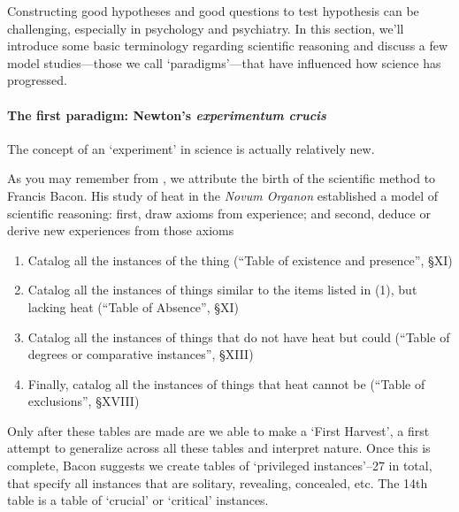\begin{refsection}
Constructing good hypotheses and good questions to test hypothesis can be challenging, especially in psychology and psychiatry. In this section, we’ll introduce some basic terminology regarding scientific reasoning and discuss a few model studies---those we call ‘paradigms’---that have influenced how science has progressed.

\paragraph{The first paradigm: Newton’s \emph{experimentum crucis}}
\label{thefirstparadigm:newton’sexperimentumcrucis}

The concept of an ‘experiment’ in science is actually relatively new. 

As you may remember from , we attribute the birth of the scientific method to Francis Bacon. His study of heat in the \emph{Novum Organon} established a model of scientific reasoning: first, draw axioms from experience; and second, deduce or derive new experiences from those axioms ~\citep[Bk. II, \S X]{Bacon:1620ui}

\begin{enumerate}
\item Catalog all the instances of the thing (“Table of existence and presence”, \S XI)

\item Catalog all the instances of things similar to the items listed in (1), but lacking heat (“Table of Absence”, \S XI)

\item Catalog all the instances of things that do not have heat but could (“Table of degrees or comparative instances”, \S XIII)

\item Finally, catalog all the instances of things that heat cannot be (“Table of exclusions”, \S XVIII)

\end{enumerate}

Only after these tables are made are we able to make a ‘First Harvest’, a first attempt to generalize across all these tables and interpret nature. Once this is complete, Bacon suggests we create tables of ‘privileged instances’--27 in total, that specify all instances that are solitary, revealing, concealed, etc. The 14th table is a table of ‘crucial’ or ‘critical’ instances.

\begin{quote}


\end{quote}
\end{refsection}
